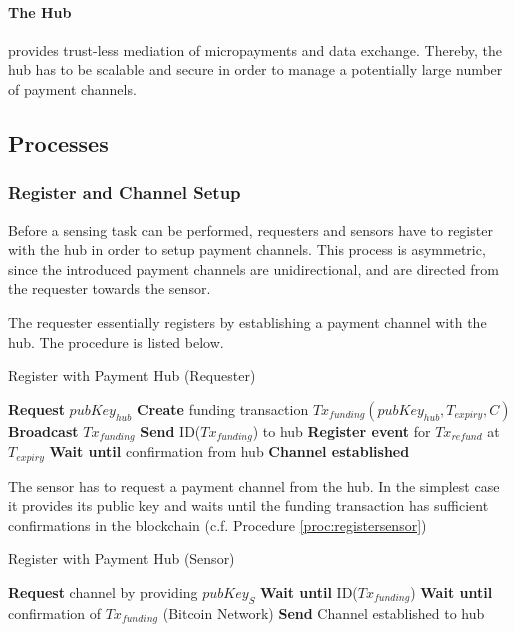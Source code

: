 \paragraph{The Hub} provides trust-less mediation of micropayments and data exchange. Thereby, the hub has to be scalable and secure in order to manage a potentially large number of payment channels. 


\subsection{Processes}

\subsubsection{Register and Channel Setup}

Before a sensing task can be performed, requesters and sensors have to register with the hub in order to setup payment channels. This process is asymmetric, since the introduced payment channels are unidirectional, and are directed from the requester towards the sensor.

The requester essentially registers by establishing a payment channel with the hub. The procedure is listed below.

\begin{algorithm}
   \caption{Register with Payment Hub (Requester)}
    \begin{algorithmic}[1]
      \State \textbf{Request} $pubKey_{hub}$
      \State \textbf{Create} funding transaction $Tx_{funding}(pubKey_{hub},T_{expiry},C)$
      \State \textbf{Broadcast} $Tx_{funding}$
      \State \textbf{Send} ID($Tx_{funding}$) to hub
      \State \textbf{Register event} for $Tx_{refund}$ at $T_{expiry}$ 
      \State \textbf{Wait until} confirmation from hub
      \State \textbf{Channel established}
\end{algorithmic}
\end{algorithm}

The sensor has to request a payment channel from the hub. In the simplest case it provides its public key and waits until the funding transaction has sufficient confirmations in the blockchain (c.f. Procedure \ref{proc:registersensor}) 

\begin{algorithm}
   \caption{Register with Payment Hub (Sensor)}
    \begin{algorithmic}[1]
      \State \textbf{Request} channel by providing $pubKey_{S}$
      \State \textbf{Wait until} ID($Tx_{funding}$)
      \State \textbf{Wait until} confirmation of $Tx_{funding}$ (Bitcoin Network)
      \State \textbf{Send} Channel established to hub
\end{algorithmic}
\label{proc:registersensor}
\end{algorithm}

